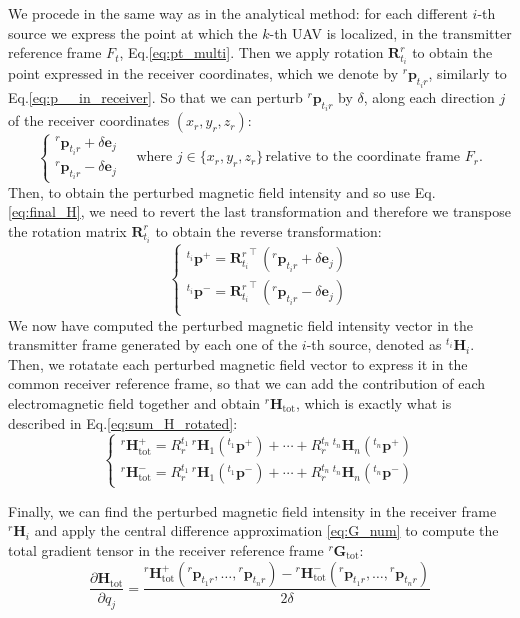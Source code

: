 We procede in the same way as in the analytical method: for each different $i$-th source we express the 
point at which the $k$-th UAV is localized,
in the transmitter reference frame $F_t$, Eq.\ref{eq:pt_multi}.
Then we apply rotation $\mathbf{R}^r_{t_i}$ to obtain the point expressed 
in the receiver coordinates, which we denote by ${}^r \mathbf{p}_{t_ir}$, similarly to Eq.\ref{eq:p__in_receiver}.
So that we can perturb ${}^r \mathbf{p}_{t_ir}$ by $\delta$, along each direction $j$ of the 
receiver coordinates $(x_r, y_r, z_r)$:
\[
\begin{cases}
    {}^r \mathbf{p}_{t_ir} + \delta \mathbf{e}_j \\
    {}^r \mathbf{p}_{t_ir} - \delta \mathbf{e}_j
\end{cases} 
\quad \text{where } j \in \{ x_r, y_r, z_r \} \, \text{relative to the coordinate frame } F_r.
\]
Then, to obtain the perturbed magnetic field intensity and so use Eq.\ref{eq:final_H}, we need to 
revert the last transformation and therefore we transpose the rotation matrix $\mathbf{R}^r_{t_i}$ to 
obtain the reverse transformation:
\[
\begin{cases}
    {}^{t_i} \mathbf{p}^+ = {\mathbf{R}^r_{t_i}}^\top \, ({}^r \mathbf{p}_{t_ir} + \delta \mathbf{e}_j) \\
    {}^{t_i} \mathbf{p}^- =  {\mathbf{R}^r_{t_i}}^\top \, ({}^r \mathbf{p}_{t_ir} - \delta \mathbf{e}_j) \\
\end{cases}
\]
We now have computed the perturbed magnetic field intensity vector in the transmitter frame 
generated by each one of the $i$-th source, denoted as ${}^{t_i} \mathbf{H}_i$.
Then, we rotatate each perturbed magnetic field vector to express it in the common receiver
reference frame, so that we can add the contribution of each electromagnetic field
together and obtain ${}^r \mathbf{H}_{\text{tot}}$, which is exactly what is described
in Eq.\ref{eq:sum_H_rotated}:
\[
\begin{cases}
    {}^r \mathbf{H}_{\text{tot}}^+ = 
    R^{t_1}_r \, {}^{r} \mathbf{H}_1({}^{t_1} \mathbf{p}^+)
    + \cdots + R^{t_n}_r \, {}^{t_n} \mathbf{H}_n({}^{t_n} \mathbf{p}^+) \\
    {}^r \mathbf{H}_{\text{tot}}^- = R^{t_1}_r \, {}^{r} \mathbf{H}_1({}^{t_1} \mathbf{p}^-)
    + \cdots + R^{t_n}_r \, {}^{t_n} \mathbf{H}_n({}^{t_n} \mathbf{p}^-)
\end{cases}
\]

Finally, we can find the perturbed magnetic field intensity in the receiver frame
${}^r \mathbf{H}_i$ and apply the central difference approximation 
\ref{eq:G_num} to compute the total gradient tensor in the receiver reference frame 
${}^r \mathbf{G}_{\text{tot}}$:
\begin{equation}
    \frac{\partial \mathbf{H}_{\text{tot}}}{\partial q_j} = 
    \frac{
     {}^r \mathbf{H}_{\text{tot}}^+ ({}^r \mathbf{p}_{t_1r}, \dots , {}^r \mathbf{p}_{t_nr})
    -  {}^r \mathbf{H}_{\text{tot}}^- ({}^r \mathbf{p}_{t_1r}, \dots , {}^r \mathbf{p}_{t_nr})}
    {2 \delta}
\end{equation}

